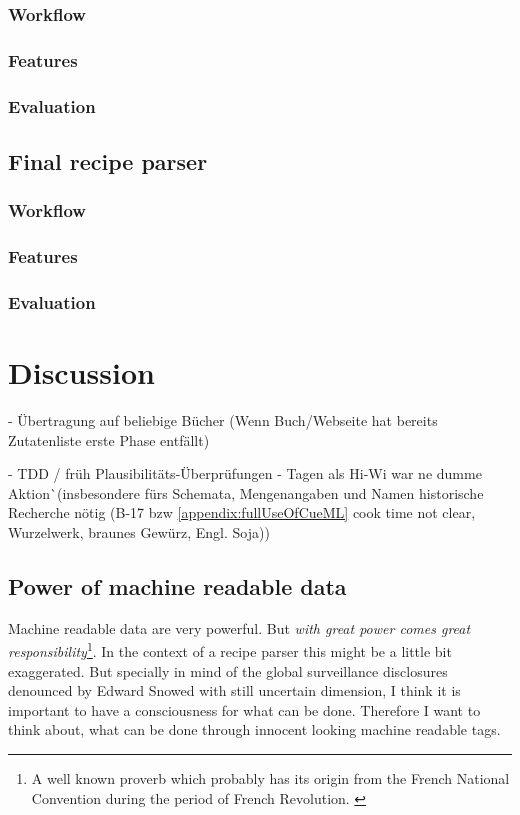 \documentclass[12pt, twoside]{report}
\begin{document}
\subsection{Workflow}
\subsection{Features}
\subsection{Evaluation}

\section{Final recipe parser}
\subsection{Workflow}
\subsection{Features}
\subsection{Evaluation}




\chapter{Discussion}
- Übertragung auf beliebige Bücher (Wenn Buch/Webseite hat bereits Zutatenliste erste Phase entfällt)

- TDD / früh Plausibilitäts-Überprüfungen - Tagen als Hi-Wi war ne dumme Aktion^^ (insbesondere fürs Schemata, Mengenangaben und Namen historische Recherche nötig (B-17 bzw \cref{appendix:fullUseOfCueML} cook time not clear,	Wurzelwerk, braunes Gewürz,	Engl. Soja))


\section{Power of machine readable data}
Machine readable data are very powerful. But \textit{with great power comes great responsibility}\footnote{A well known proverb which probably has its origin from the French National Convention during the period of French Revolution. \parencite{quoteInvestigator}}. In the context of a recipe parser this might be a little bit exaggerated. But specially in mind of the global surveillance disclosures denounced by Edward Snowed with still uncertain dimension, I think it is important to have a consciousness for what can be done. Therefore I want to think about, what can be done through innocent looking machine readable tags. 
\bigskip
\end{document}
